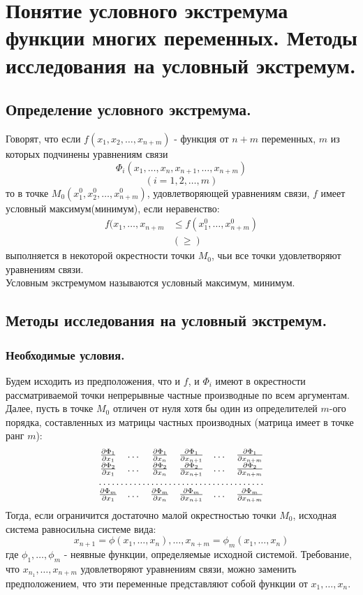 \section{Понятие условного экстремума функции многих переменных. 
Методы исследования на условный экстремум.}
\subsection{Определение условного экстремума.}
Говорят, что если $f(x_1, x_2, \dots, x_{n+m})$ - функция от $n+m
$ переменных, $m$ из которых подчинены уравнениям связи
$$\Phi_i(x_1,\dots, x_n, x_{n+1},\dots, x_{n+m})$$
$$(i = 1, 2,\dots, m)$$то в точке $M_0(x_1^0, x_2^0,
\dots, x^0_{n+m})$, удовлетворяющей уравнениям связи, $f$ имеет условный максимум(минимум), если неравенство:
\begin{align*} f(x_1, \dots, x_{n+m} &\leq f(x_1^0, \dots, x^0_{n+m})\\
	&(\geq)
\end{align*}
выполняется в некоторой окрестности точки $M_0$, чьи все точки удовлетворяют уравнениям связи.\\

Условным экстремумом называются условный максимум, минимум.
\subsection{Методы исследования на условный экстремум.}
\subsubsection{Необходимые условия.}
Будем исходить из предположения, что и $f$, и $\Phi_i$ имеют
в окрестности рассматриваемой точки непрерывные частные производные
по всем аргументам. Далее, пусть в точке $M_0$ отличен от нуля хотя бы один из определителей $m$-ого порядка, составленных из матрицы частных производных (матрица имеет в точке ранг $m$):
$$\begin{matrix}
	{\partial\Phi_1 \over \partial x_1}& \dots &
	{\partial\Phi_1 \over \partial x_n}&
	{\partial\Phi_1 \over \partial x_{n+1}}&
	\dots&
	{\partial\Phi_1 \over \partial x_{n+m}}\\
	{\partial\Phi_2 \over \partial x_1}& \dots &
	{\partial\Phi_2 \over \partial x_n}&
	{\partial\Phi_2 \over \partial x_{n+1}}&
	\dots&
	{\partial\Phi_2 \over \partial x_{n+m}}\\
	\hdotsfor{6}\\
	{\partial\Phi_m \over \partial x_1}& \dots &
	{\partial\Phi_m \over \partial x_n}&
	{\partial\Phi_m \over \partial x_{n+1}}&
	\dots&
	{\partial\Phi_m \over \partial x_{n+m}}\\
\end{matrix}$$
Тогда, если ограничится достаточно малой окрестностью точки $M_0$, исходная система равносильна системе вида:
$$x_{n+1} = \phi(x_1,\dotsc, x_n),\dotsc, x_{n+m} = \phi_m(x_1,\dotsc,x_n)$$
где $\phi_1,\dotsc, \phi_m$ - неявные функции, определяемые исходной системой. Требование, что $x_{n_1}, \dotsc, x_{n+m}$ удовлетворяют уравнениям связи, можно заменить предположением, что эти переменные представляют собой функции от $x_1,\dotsc, x_n$.\\

